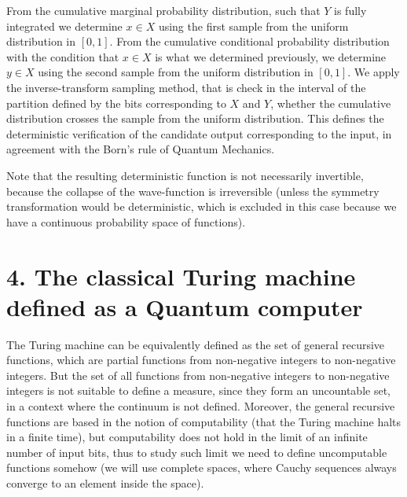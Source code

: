 \documentclass[11pt]{book}
\begin{document}
From the cumulative marginal probability distribution, such that \(Y\)
is fully integrated we determine \(x\in X\) using the first sample from
the uniform distribution in \([0,1]\). From the cumulative conditional
probability distribution with the condition that \(x\in X\) is what we
determined previously, we determine \(y\in X\) using the second sample
from the uniform distribution in \([0,1]\). We apply the
inverse-transform sampling
method\cite{Rubinstein2016Simulation}, that is check in the interval of the partition defined by
the bits corresponding to \(X\) and \(Y\), whether the cumulative
distribution crosses the sample from the uniform distribution. This
defines the deterministic verification of the candidate output
corresponding to the input, in agreement with the Born's rule of Quantum
Mechanics.

Note that the resulting deterministic function is not necessarily
invertible, because the collapse of the wave-function is irreversible
(unless the symmetry transformation would be deterministic, which is
excluded in this case because we have a continuous probability space of
functions).

\hypertarget{the-classical-turing-machine-defined-as-a-quantum-computer}{%
\section{4. The classical Turing machine defined as a Quantum
computer}\label{the-classical-turing-machine-defined-as-a-quantum-computer}}

The Turing machine can be equivalently defined as the set of general
recursive functions, which are partial functions from non-negative
integers to non-negative
integers\cite{sep-recursive-functions}.
But the set of all functions from non-negative integers to non-negative
integers is not suitable to define a measure, since they form an
uncountable set, in a context where the continuum is not defined.
Moreover, the general recursive functions are based in the notion of
computability (that the Turing machine halts in a finite time), but
computability does not hold in the limit of an infinite number of input
bits, thus to study such limit we need to define uncomputable functions
somehow (we will use complete spaces, where Cauchy sequences always
converge to an element inside the space).
\end{document}
